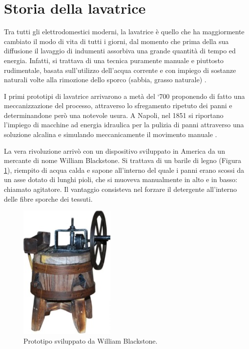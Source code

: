 \section{Storia della lavatrice}
Tra tutti gli elettrodomestici moderni, la lavatrice è quello che ha maggiormente cambiato il modo di vita di tutti i giorni, dal momento che prima della sua diffusione il lavaggio di indumenti assorbiva una grande quantità di tempo ed energia. Infatti, si trattava di una tecnica puramente manuale e piuttosto rudimentale, basata sull’utilizzo dell’acqua corrente e con impiego di sostanze naturali volte alla rimozione dello sporco (sabbia, grasso naturale) \cite{de2002industrie}.


I primi prototipi di lavatrice arrivarono a metà del ‘700 proponendo di fatto una meccanizzazione del processo, attraverso lo sfregamento ripetuto dei panni e determinandone però una notevole usura.
A Napoli, nel 1851 si riportano l’impiego di macchine ad energia idraulica per la pulizia di panni attraverso una soluzione alcalina e simulando meccanicamente il movimento manuale 
\cite{de2002industrie}.


La vera rivoluzione arrivò con un dispositivo sviluppato in America da un mercante di nome William Blackstone. Si trattava di un barile di legno (Figura \ref{Figura 1}), riempito di acqua calda e sapone all’interno del quale i panni erano scossi da un asse dotato di lunghi pioli, che si muoveva manualmente in alto e in basso: chiamato agitatore. Il vantaggio consisteva nel forzare il detergente all’interno delle fibre sporche dei tessuti.


\begin{figure}[h!]
    \centering
    \includegraphics[scale=0.4]{Immagini/Senza titolo.jpg}
    \caption{Prototipo sviluppato da William Blackstone.}
    \label{Figura 1}
\end{figure}

